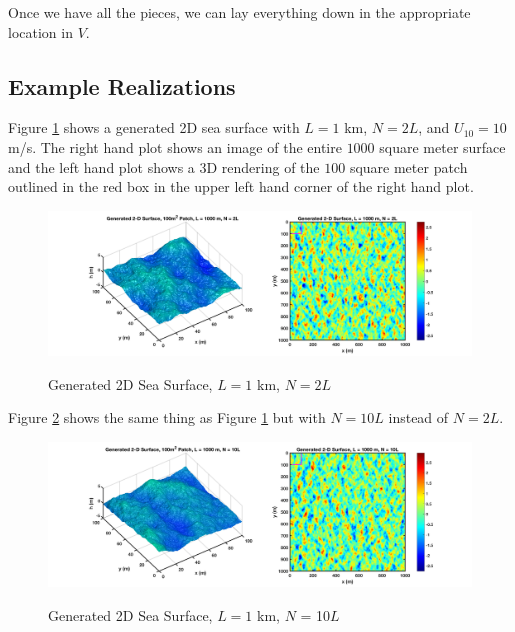 Once we have all the pieces, we can lay everything down in the appropriate location in $V$.

\subsection{Example Realizations}
Figure \ref{os_fig:8} shows a generated 2D sea surface with $L = 1$ km, $N = 2L$, and $U_{10} = 10$ m/s. The right hand plot shows an image of the entire $1000$ square meter surface and the left hand plot shows a 3D rendering of the $100$ square meter patch outlined in the red box in the upper left hand corner of the right hand plot.
\begin{figure}[H]
  \begin{center}
\includegraphics[width=6in]{../media/Ocean_Surface/sea_surface_2d_surf_1000.png}
  \end{center}
  \renewcommand{\baselinestretch}{1} \small\normalsize
  \begin{quote}
    \caption[Generated 2D Sea Surface, $L = 1$ km, $N=2L$]{Generated 2D Sea Surface, $L = 1$ km, $N=2L$ \label{os_fig:8}}
  \end{quote}
\end{figure}
\renewcommand{\baselinestretch}{2} \small\normalsize

Figure \ref{os_fig:8a} shows the same thing as Figure \ref{os_fig:8} but with $N=10L$ instead of $N = 2L$.
\begin{figure}[H]
  \begin{center}
\includegraphics[width=6in]{../media/Ocean_Surface/sea_surface_2d_surf_1000_10.png}
  \end{center}
  \renewcommand{\baselinestretch}{1} \small\normalsize
  \begin{quote}
    \caption[Generated 2D Sea Surface, $L = 1$ km, $N$ = 10$L$]{Generated 2D Sea Surface, $L = 1$ km, $N$ = 10$L$ \label{os_fig:8a}}
  \end{quote}
\end{figure}
\renewcommand{\baselinestretch}{2} \small\normalsize

